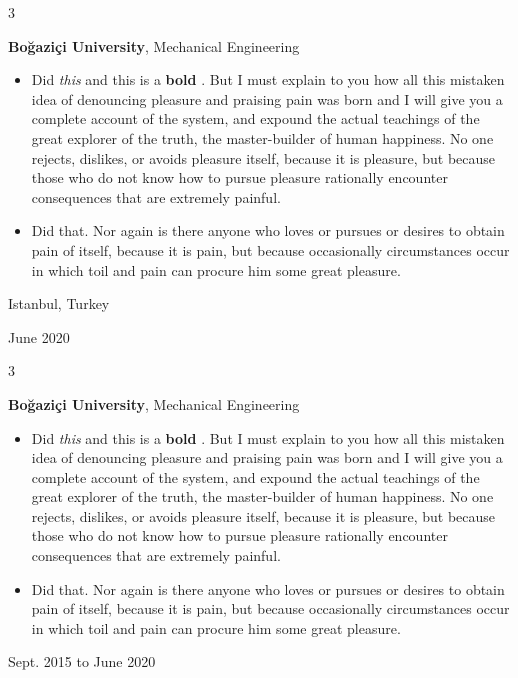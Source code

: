 \documentclass[10pt, letterpaper]{article}
\newenvironment{highlights}{
    \begin{itemize}[
        topsep=0.10 cm,
        parsep=0.10 cm,
        partopsep=0pt,
        itemsep=0pt,
        leftmargin=0.4 cm + 10pt
    ]
}{
    \end{itemize}
} %
\newenvironment{threecolentry}[3][]{
    \onecolentry
    \def\thirdColumn{#3}
    \setcolumnwidth{1 cm, \fill, 4.5 cm}
    \begin{paracol}{3}
    {\raggedright #2} \switchcolumn
}{
    \switchcolumn \raggedleft \thirdColumn
    \end{paracol}
    \endonecolentry
} %
\let\hrefWithoutArrow\href
\renewcommand{\href}[2]{\hrefWithoutArrow{#1}{\mbox{\ifthenelse{\equal{#2}{}}{ }{#2 }\raisebox{.15ex}{\footnotesize \faExternalLink*}}}}
\begin{document}
        \begin{threecolentry}{\textbf{}}{
            Istanbul, Turkey

        June 2020
        }
            \textbf{Boğaziçi University}, Mechanical Engineering
            \begin{highlights}
                \item Did \textit{this} and this is a \textbf{bold} \href{https://example.com}{link}. But I must explain to you how all this mistaken idea of denouncing pleasure and praising pain was born and I will give you a complete account of the system, and expound the actual teachings of the great explorer of the truth, the master-builder of human happiness. No one rejects, dislikes, or avoids pleasure itself, because it is pleasure, but because those who do not know how to pursue pleasure rationally encounter consequences that are extremely painful.
                \item Did that. Nor again is there anyone who loves or pursues or desires to obtain pain of itself, because it is pain, but because occasionally circumstances occur in which toil and pain can procure him some great pleasure.
            \end{highlights}
        \end{threecolentry}

        \vspace{0.2 cm}

        \begin{threecolentry}{\textbf{}}{
            Sept. 2015 to June 2020
        }
            \textbf{Boğaziçi University}, Mechanical Engineering
            \begin{highlights}
                \item Did \textit{this} and this is a \textbf{bold} \href{https://example.com}{link}. But I must explain to you how all this mistaken idea of denouncing pleasure and praising pain was born and I will give you a complete account of the system, and expound the actual teachings of the great explorer of the truth, the master-builder of human happiness. No one rejects, dislikes, or avoids pleasure itself, because it is pleasure, but because those who do not know how to pursue pleasure rationally encounter consequences that are extremely painful.
                \item Did that. Nor again is there anyone who loves or pursues or desires to obtain pain of itself, because it is pain, but because occasionally circumstances occur in which toil and pain can procure him some great pleasure.
            \end{highlights}
        \end{threecolentry}
\end{document}
